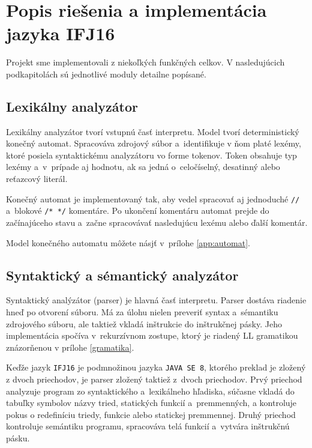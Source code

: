 \documentclass[11pt,a4paper]{article}
\begin{document}
\section{Popis riešenia a implementácia jazyka IFJ16}
\label{popis}

Projekt sme implementovali z niekoľkých funkčných celkov. V nasledujúcich podkapitolách sú jednotlivé moduly detailne popísané.

    \subsection{Lexikálny analyzátor}
    \label{lexer}
    Lexikálny analyzátor tvorí vstupnú časť interpretu. Model tvorí deterministický
    konečný automat. Spracováva zdrojový súbor a~identifikuje v ňom platé lexémy,
    ktoré posiela syntaktickému analyzátoru vo forme tokenov. Token obsahuje typ lexémy
    a~v~prípade aj hodnotu, ak sa jedná o~celočíselný, desatinný alebo reťazcový literál.

    Konečný automat je implementovaný tak, aby vedel spracovať aj jednoduché \texttt{//}
    a~blokové \texttt{/* */} komentáre. Po ukončení komentáru  automat prejde do
    začínajúceho stavu a~začne spracovávať nasledujúcu lexému alebo ďalší komentár.

    Model konečného automatu môžete násjť v~prílohe \ref{app:automat}.


    \subsection{Syntaktický a sémantický analyzátor}
    \label{parser}
    Syntaktický analýzátor (parser) je hlavná časť interpretu. Parser dostáva
    riadenie hneď po otvorení súboru. Má za úlohu nielen preveriť syntax
    a~sémantiku zdrojového súboru, ale taktiež vkladá inštrukcie do inštrukčnej
    pásky. Jeho implementácia spočíva v~rekurzívnom zostupe, ktorý je riadený
    LL gramatikou znázorňenou v prílohe \ref{gramatika}.

    Keďže jazyk \texttt{IFJ16} je podmnožinou jazyka \texttt{JAVA SE 8},
    ktorého preklad je zložený z dvoch priechodov, je parser zložený
    taktiež z~dvoch priechodov. Prvý priechod analyzuje program zo syntaktického
    a~lexikálneho hľadiska, súčasne vkladá do tabuľky symbolov názvy tried,
    statických funkcií a~premmenných, a kontroluje pokus o redefiníciu triedy,
    funkcie alebo statickej premmennej. Druhý priechod kontroluje semántiku
    programu, spracováva telá funkcií a~vytvára inštrukčnú pásku.
\end{document}
